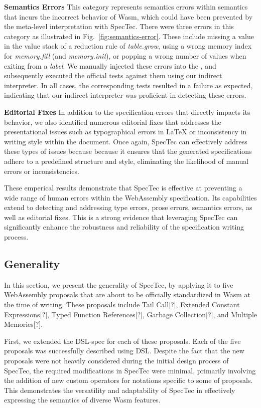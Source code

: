 \textbf{Semantics Errors}
This category represents semantics errors within semantics that incurs the
incorrect behavior of Wasm, which could have been prevented by the meta-level
interpretation with SpecTec.  There were three errors in this category as
illustrated in Fig.~\ref{fig:semantics-error}. These include missing a value in
the value stack of a reduction rule of \textit{table.grow}, using a wrong
memory index for \textit{memory.fill} (and \textit{memory.init}), or popping a
wrong number of values when exiting from a \textit{label}.   We manually injected these
errors into the \specdsl, and subsequently executed the official tests against them
using our indirect interpreter. In all cases, the corresponding tests resulted
in a failure as expected, indicating that our indirect interpreter was proficient
in detecting these errors.

\textbf{Editorial Fixes}
In addition to the specification errors that directly impacts its behavior, we
also identified numerous editorial fixes that addresses the presentational
issues such as typographical errors in LaTeX or inconsistency in writing style
within the document. Once again, SpecTec can effectively address these types of
issues because because it ensures that the generated specifications adhere to a
predefined structure and style, eliminating the likelihood of manual errors or
inconsistencies.

These emperical results demonstrate that SpecTec is effective at preventing a
wide range of human errors within the WebAssembly specification.  Its
capabilities extend to detecting and addressing type errors, prose errors,
semantics errors, as well as editorial fixes. This is a strong evidence that
leveraging SpecTec can significantly enhance the robustness and reliability of
the specification writing process.

\subsection{Generality}
In this section, we present the generality of SpecTec, by applying it to five
WebAssembly proposals that are about to be officially standardized in Wasm at
the time of writing. These proposals include Tail Call[?], Extended Constant
Expressions[?], Typed Function References[?], Garbage Collection[?], and
Multiple Memories[?].

First, we extended the DSL-spec for each of these proposals. Each
of the five proposals was successfully described using DSL.  Despite the fact
that the new proposals were not heavily considered during the initial design
process of SpecTec, the required modifications in SpecTec were minimal,
primarily involving the addition of new custom operators for notations specific
to some of proposals. This demonstrates the versatility and adaptability of
SpecTec in effectively expressing the semantics of diverse Wasm features.

